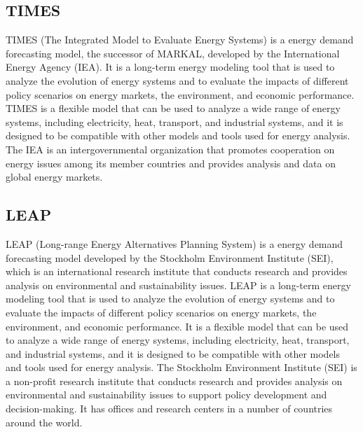 \documentclass[lettersize,journal]{IEEEtran}
\begin{document}
  \subsection{TIMES}
  TIMES (The Integrated Model to Evaluate Energy Systems) is a energy demand forecasting model, the successor of MARKAL, developed by the International Energy Agency (IEA). It is a long-term energy modeling tool that is used to analyze the evolution of energy systems and to evaluate the impacts of different policy scenarios on energy markets, the environment, and economic performance. TIMES is a flexible model that can be used to analyze a wide range of energy systems, including electricity, heat, transport, and industrial systems, and it is designed to be compatible with other models and tools used for energy analysis. The IEA is an intergovernmental organization that promotes cooperation on energy issues among its member countries and provides analysis and data on global energy markets.

  \subsection{LEAP}
  LEAP (Long-range Energy Alternatives Planning System) is a energy demand forecasting model developed by the Stockholm Environment Institute (SEI), which is an international research institute that conducts research and provides analysis on environmental and sustainability issues. LEAP is a long-term energy modeling tool that is used to analyze the evolution of energy systems and to evaluate the impacts of different policy scenarios on energy markets, the environment, and economic performance. It is a flexible model that can be used to analyze a wide range of energy systems, including electricity, heat, transport, and industrial systems, and it is designed to be compatible with other models and tools used for energy analysis. The Stockholm Environment Institute (SEI) is a non-profit research institute that conducts research and provides analysis on environmental and sustainability issues to support policy development and decision-making. It has offices and research centers in a number of countries around the world.
\end{document}
